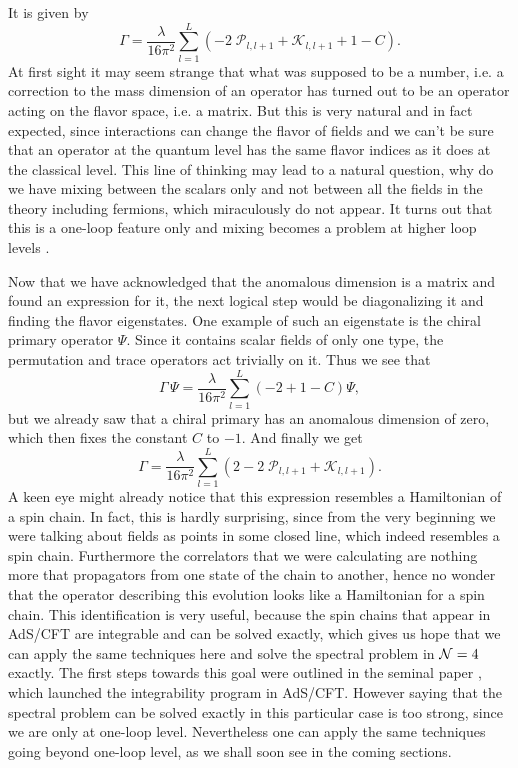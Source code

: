 It is given by
\begin{equation}
	\Gamma = \frac{\lambda}{16\pi^2}\sum_{l=1}^L \left( - 2 \; \mathcal{P}_{l,l+1} + \mathcal{K}_{l,l+1} + 1 - C\right).
\end{equation}
At first sight it may seem strange that what was supposed to be a number, i.e. a correction to the mass dimension of an operator has turned out to be an operator acting on the flavor space, i.e. a matrix. 
But this is very natural and in fact expected, since interactions can change the flavor of fields and we can't be sure that an operator at the quantum level has the same flavor indices as it does at the classical level. 
This line of thinking may lead to a natural question, why do we have mixing between the scalars only and not between all the fields in the theory including fermions, which miraculously do not appear. 
It turns out that this is a one-loop feature only and mixing becomes a problem at higher loop levels \cite{Minahan:2002ve}. 

Now that we have acknowledged that the anomalous dimension is a matrix and found an expression for it, the next logical step would be diagonalizing it and finding the flavor eigenstates. 
One example of such an eigenstate is the chiral primary operator $\Psi$. 
Since it contains scalar fields of only one type, the permutation and trace operators act trivially on it. Thus we see that
\begin{equation}
	\Gamma \, \Psi = \frac{\lambda}{16\pi^2}\sum_{l=1}^L \left( -2 + 1 - C \right) \Psi,
\end{equation}
but we already saw that a chiral primary has an anomalous dimension of zero, which then fixes the constant $C$ to $-1$. 
And finally we get
\begin{equation}
	\Gamma = \frac{\lambda}{16\pi^2}\sum_{l=1}^L \left(2 - 2 \; \mathcal{P}_{l,l+1} + \mathcal{K}_{l,l+1} \right).
\end{equation}
A keen eye might already notice that this expression resembles a Hamiltonian of a spin chain. 
In fact, this is hardly surprising, since from the very beginning we were talking about fields as points in some closed line, which indeed resembles a spin chain. 
Furthermore the correlators that we were calculating are nothing more that propagators from one state of the chain to another, hence no wonder that the operator describing this evolution looks like a Hamiltonian for a spin chain. 
This identification is very useful, because the spin chains that appear in AdS/CFT are integrable and can be solved exactly, which gives us hope that we can apply the same techniques here and solve the spectral problem in $\mathcal{N}=4$ exactly. 
The first steps towards this goal were outlined in the seminal paper \cite{Minahan:2002ve}, which launched the integrability program in AdS/CFT. 
However saying that the spectral problem can be solved exactly in this particular case is too strong, since we are only at one-loop level. 
Nevertheless one can apply the same techniques going beyond one-loop level, as we shall soon see in the coming sections. 


